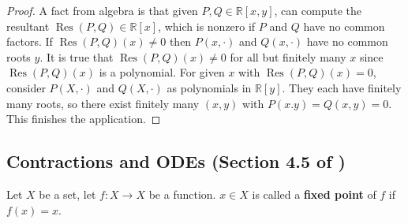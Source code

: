 \begin{example}
\begin{proof}
A fact from algebra is that given \(P, Q \in \mathbb{R}[x,y]\), can compute the resultant \(\operatorname{Res}(P,Q) \in \mathbb{R}[x]\), which is nonzero if \(P\) and \(Q\) have no common factors. If \(\operatorname{Res}(P,Q)(x) \neq 0\) then \(P(x, \cdot)\) and \(Q(x, \cdot)\) have no common roots \(y\). It is true that \(\operatorname{Res}(P,Q)(x) \neq 0\) for all but finitely many \(x\) since \(\operatorname{Res}(P,Q)(x) \) is a polynomial. For given \(x\) with \(\operatorname{Res}(P,Q)(x) =0\), consider \(P(X, \cdot)\) and \(Q(X, \cdot)\) as polynomials in \(\mathbb{R}[y]\). They each have finitely many roots, so there exist finitely many \((x,y)\) with \(P(x.y) = Q(x,y) = 0\). This finishes the application.

\end{proof}



\end{example}

\subsection{Contractions and ODEs (Section 4.5 of \citet{pugh2015real})}\label{ra.contractions.odes}

\begin{definition}

Let \(X\) be a set, let \(f: X \to X\) be a function. \(x \in X\) is called a \textbf{fixed point} of \(f\) if \(f(x) = x\).

\end{definition}


